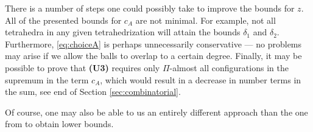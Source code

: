 \begin{remark}
	There is a number of steps one could possibly take to improve the bounds for $z$. All of the presented bounds for $c_A$ are not minimal. For example, not all tetrahedra in any given tetrahedrization will attain the bounds $\delta_1$ and $\delta_2$. Furthermore, \eqref{eq:choiceA} is perhaps unnecessarily conservative --- no problems may arise if we allow the balls to overlap to a certain degree. Finally, it may be possible to prove that \textbf{(U3)} requires only $\Pi$-almost all configurations in the supremum in the term $c_A$, which would result in a decrease in number terms in the sum, see end of Section \ref{sec:combinatorial}.

	Of course, one may also be able to us an entirely different approach than the one from \cite{DDG12} to obtain lower bounds.
\end{remark}



